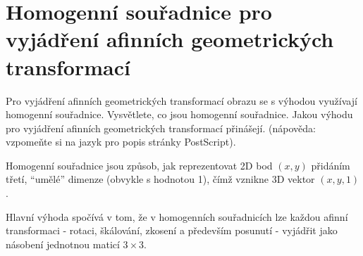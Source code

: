\section{Homogenní souřadnice pro vyjádření afinních geometrických transformací}
Pro vyjádření afinních geometrických transformací obrazu se s výhodou využívají homogenní souřadnice. 
Vysvětlete, co jsou homogenní souřadnice. Jakou výhodu pro vyjádření afinních geometrických transformací přinášejí. 
(nápověda: vzpomeňte si na jazyk pro popis stránky PostScript).

Homogenní souřadnice jsou způsob, jak reprezentovat 2D bod $(x,y)$ přidáním třetí, \enquote{umělé} dimenze (obvykle s 
hodnotou 1), čímž vznikne 3D vektor $(x,y,1)$.

Hlavní výhoda spočívá v tom, že v homogenních souřadnicích lze každou afinní transformaci - rotaci, škálování, zkosení 
a především posunutí - vyjádřit jako násobení jednotnou maticí $3 \times 3$.